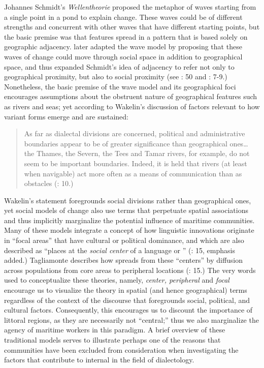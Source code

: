 Johannes Schmidt’s \citeyear*{Schmidt1872} \textit{Wellentheorie} proposed the metaphor of waves starting from a single point in a pond to explain  change. These waves could be of different strengths and concurrent with other waves that have different starting points, but the basic premise was that  features spread in a pattern that is based solely on geographic adjacency. \citet{BaileyEtAl1993} later adapted the wave model by proposing that these waves of change could move through social space in addition to geographical space, and thus expanded Schmidt’s idea of adjacency to refer not only to geographical proximity, but also to social proximity (see \citealt{Petyt1980}: 50 and \citealt{AuerEtAl2005}: 7-9.) Nonetheless, the basic premise of the wave model and its geographical foci encourages assumptions about the obstruent nature of geographical features such as rivers and seas; yet according to Wakelin’s discussion of factors relevant to how variant  forms emerge and are sustained: 

\begin{quotation}
As far as dialectal divisions are concerned, political and administrative boundaries appear to be of greater significance than geographical ones… the Thames, the Severn, the Tees and Tamar rivers, for example, do not seem to be important  boundaries. Indeed, it is held that rivers (at least when navigable) act more often as a means of communication than as obstacles (\citealt{Wakelin1977}: 10.)\end{quotation}

Wakelin’s statement foregrounds social divisions rather than geographical ones, yet social models of  change also use terms that perpetuate spatial associations and thus implicitly marginalize the potential influence of maritime communities. Many of these models integrate a concept of how linguistic innovations originate in “focal areas” that have cultural or political dominance, and which are also described as “places at the \textit{social center} of a language or ” (\citealt{Tagliamonte2013}: 15, emphasis added.) Tagliamonte describes how  spreads from these “centers” by diffusion across populations from core areas to peripheral locations (\citeyear*{Tagliamonte2013}: 15.) The very words used to conceptualize these theories, namely, \textit{center, peripheral} and \textit{focal} encourage us to visualize the theory in spatial (and hence geographical) terms regardless of the context of the discourse that foregrounds social, political, and cultural factors. Consequently, this encourages us to discount the importance of littoral regions, as they are necessarily not “central;” thus we also marginalize the agency of maritime workers in this paradigm. A brief overview of these traditional models serves to illustrate perhaps one of the reasons that  communities have been excluded from consideration when investigating the factors that contribute to internal  in the field of dialectology. 

